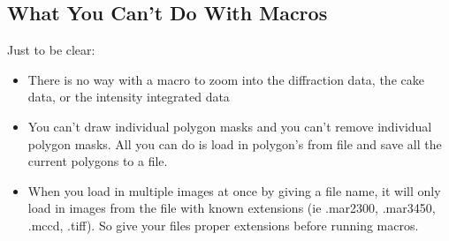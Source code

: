 \subsection{What You Can't Do With Macros}

Just to be clear:
\begin{itemize}
    \item There is no way with a macro to zoom into the diffraction
    data, the cake data, or the intensity integrated data
    \item You can't draw individual polygon masks and you can't remove
    individual polygon masks. All you can do is load in polygon's from
    file and save all the current polygons to a file.
    \item When you load in multiple images at once by giving a file 
    name, it will only load in images from the file with known 
    extensions (ie .mar2300, .mar3450, .mccd, .tiff). So give your 
    files proper extensions before running macros.
\end{itemize}

